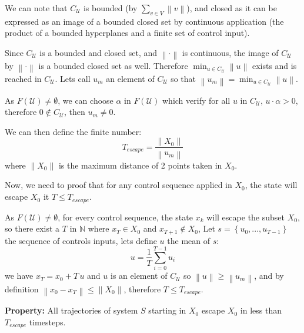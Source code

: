 \documentclass[12pt]{article}
\begin{document}
We can note that $C_\mathcal{U}$ is bounded (by $\sum_{v \in V} \left \| v \right \|$), and closed as it can be expressed as an image of a bounded closed set by continuous application (the product of a bounded hyperplanes and a finite set of control input).

Since $C_\mathcal{U}$ is a bounded and closed set, and $\left \| \cdot \right \|$ is continuous, the image of $C_\mathcal{U}$ by $\left \| \cdot \right \|$ is a bounded closed set as well.
Therefore  $\min_{  u \in C_\mathcal{U}} \left \| u \right \|$ exists and is reached in $C_\mathcal{U}$. Lets call $u_m$ an element of $C_\mathcal{U}$ so that $\left \| u_m \right \| = \min_{  u \in C_\mathcal{U}} \left \| u \right \|$.

As $F(\mathcal{U}) \neq \emptyset$, we can choose $\alpha$ in $F(\mathcal{U})$ which verify for all $u$ in $C_\mathcal{U}$, $u \cdot \alpha >0$, therefore $0 \notin C_\mathcal{U}$, then $u_m \neq 0$.

We can then define the finite number:
\begin{equation}
T_{escape} = \frac{\left \| X_0 \right \|}{\left \| u_m \right \|}
\end{equation}
where $\left \| X_0 \right \|$ is the maximum distance of 2 points taken in $X_0$.

Now, we need to proof that for any control sequence applied in $X_0$, the state will escape $X_0$ it $T \leq T_{escape}$.

As $F(\mathcal{U}) \neq \emptyset$, for every control sequence, the state $x_k$ will escape the subset $X_0$, so there exist a $T$ in $\mathbb{N}$ where $x_{T} \in X_0$ and $x_{T+1} \notin X_0$, Let $s = \left \{u_0,...,u_{T-1} \right \}$ the sequence of controls inputs, lets define $u$ the mean of $s$:
\begin{equation}
u = \frac{1}{T} \sum_{i=0}^{T-1} u_i
\end{equation}
we have $x_T = x_0 + T \, u$ and $u$ is an element of $C_\mathcal{U}$ so $\left \| u \right \| \geq \left \| u_m \right \|$, and by definition $\left \| x_0 - x_T \right \| \leq \left \| X_0 \right \|$, therefore $T \leq T_ {escape}$.


\textbf{Property:}
All trajectories of system $S$ starting in $X_0$ escape $X_0$ in less than $T_{escape}$ timesteps.
\end{document}
